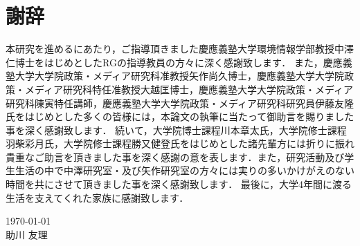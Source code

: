 \chapter*{謝辞}
本研究を進めるにあたり，ご指導頂きました慶應義塾大学環境情報学部教授中澤仁博士をはじめとしたRGの指導教員の方々に深く感謝致します．
また，慶應義塾大学大学院政策・メディア研究科准教授矢作尚久博士，慶應義塾大学大学院政策・メディア研究科特任准教授大越匡博士，慶應義塾大学大学院政策・メディア研究科陳寅特任講師，慶應義塾大学大学院政策・メディア研究科研究員伊藤友隆氏をはじめとした多くの皆様には，本論文の執筆に当たって御助言を賜りました事を深く感謝致します．
続いて，大学院博士課程川本章太氏，大学院修士課程羽柴彩月氏，大学院修士課程勝又健登氏をはじめとした諸先輩方には折りに振れ貴重なご助言を頂きました事を深く感謝の意を表します．また，研究活動及び学生生活の中で中澤研究室・及び矢作研究室の方々には実りの多いかけがえのない時間を共にさせて頂きました事を深く感謝致します．
最後に，大学4年間に渡る生活を支えてくれた家族に感謝致します．

\begin{flushright}
\today\\
助川 友理
\end{flushright}